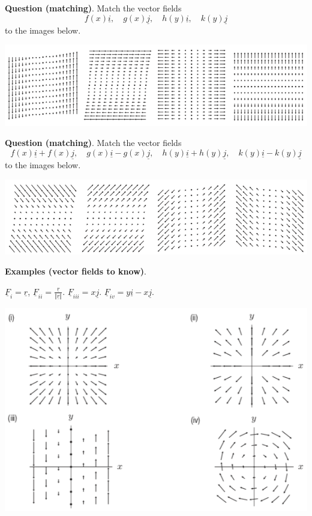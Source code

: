 \documentclass[12pt,letterpaper,noanswers]{exam}
\newcommand{\mb}[1]{\underline{#1}}
\begin{document}
\noindent\textbf{Question (matching)}.  Match the vector fields \[f(x)\mb i, \quad g(x)\mb j, \quad h(y)\mb i,\quad k(y)\mb j\] to the images below.  %

\hspace{-0.5in}\includegraphics[width=\linewidth]{img/C24p2b-18.png}
\vfill
%

\noindent\textbf{Question (matching)}.  Match the vector fields \[f(x)\mb i+f(x)\mb j,\quad g(x)\mb i - g(x)\mb j,\quad h(y)\mb i + h(y)\mb j,\quad k(y)\mb i - k(y)\mb j\] to the images below. %

\hspace{-0.5in}\includegraphics[width=\linewidth]{img/C24p3b-18.png}

\vfill



\noindent\textbf{Examples (vector fields to know)}. 

$\mb F_i = \mb r$, $\mb F_{ii} = \frac{\mb r}{\Vert \mb r\Vert}$.  $\mb F_{iii} = x\mb j$.  $\mb F_{iv} = y\mb i - x\mb j.$


\includegraphics[width=0.8\linewidth]{img/C24p4-18.png}
\end{document}
